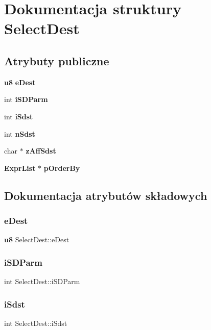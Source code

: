 \section{Dokumentacja struktury Select\+Dest}
\label{struct_select_dest}
\subsection*{Atrybuty publiczne}
\begin{DoxyCompactItemize}
\item 
\textbf{ u8} \textbf{ e\+Dest}
\item 
int \textbf{ i\+S\+D\+Parm}
\item 
int \textbf{ i\+Sdst}
\item 
int \textbf{ n\+Sdst}
\item 
char $\ast$ \textbf{ z\+Aff\+Sdst}
\item 
\textbf{ Expr\+List} $\ast$ \textbf{ p\+Order\+By}
\end{DoxyCompactItemize}


\subsection{Dokumentacja atrybutów składowych}
\mbox{\label{struct_select_dest_a779c1809acadd15898db0b20e31cc23f}} 
\subsubsection{eDest}
{\footnotesize\ttfamily \textbf{ u8} Select\+Dest\+::e\+Dest}

\mbox{\label{struct_select_dest_ad30d63b2b7216a533a5ea476412664aa}} 
\subsubsection{iSDParm}
{\footnotesize\ttfamily int Select\+Dest\+::i\+S\+D\+Parm}

\mbox{\label{struct_select_dest_adbc1c5f38b8c95da1d05e8c25dee400f}} 
\subsubsection{iSdst}
{\footnotesize\ttfamily int Select\+Dest\+::i\+Sdst}


